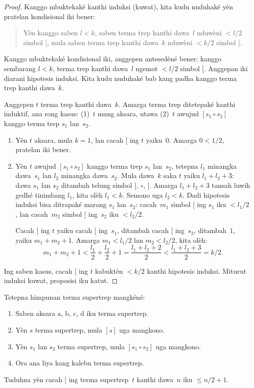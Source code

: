 \documentclass[../../../include/open-logic-section]{subfiles}
\begin{document}
\begin{proof}
Kanggo mbuktekaké kanthi induksi
(kuwat), kita kudu nuduhaké yèn
pratelan kondisional iki bener:
\begin{quote}
  Yèn kanggo saben $l < k$,
  saben terma trep kanthi dawa~$l$
  nduwèni $< l/2$ simbol $[$,
  mula saben terma trep kanthi
  dawa~$k$ nduwèni $< k/2$
  simbol $[$.
\end{quote}
Kanggo mbuktekaké kondisional
iki, anggepen antesedèné bener:
kanggo sembarang $l<k$,
terma trep kanthi dawa~$l$
ngemot $< l/2$ simbol $[$.
Anggepan iki diarani
hipotesis induksi. Kita kudu
nuduhaké bab kang padha kanggo
terma trep kanthi dawa~$k$.

Anggepen $t$ terma trep kanthi
dawa~$k$. Amarga terma trep
ditetepaké kanthi induktif,
ana rong kasus: (1)~$t$ mung
aksara, utawa (2)~$t$ awujud
$[s_1 \circ s_2]$ kanggo
terma trep $s_1$ lan~$s_2$.
\begin{enumerate}
\item Yèn $t$ aksara, mula
  $k = 1$, lan cacah $[$
  ing $t$ yaiku~$0$.
  Amarga $0 < 1/2$, pratelan
  iki bener.
\item Yèn $t$ awujud
  $[s_1 \circ s_2]$ kanggo
  terma trep $s_1$ lan~$s_2$,
  tetepna $l_1$ minangka
  dawa~$s_1$ lan $l_2$
  minangka dawa~$s_2$.
  Mula dawa~$k$ saka $t$
  yaiku $l_1+l_2+3$:
  dawa $s_1$ lan $s_2$
  ditambah telung simbol
  $[$, $\circ$, $]$.
  Amarga $l_1+l_2+3$
  tansah luwih gedhé tinimbang
  $l_1$, kita olèh $l_1 < k$.
  Semono uga $l_2
  < k$. Dadi hipotesis induksi
  bisa ditrapaké marang
  $s_1$ lan~$s_2$:
  cacah~$m_1$ simbol $[$
  ing $s_1$ iku $< l_1/2$,
  lan cacah~$m_2$ simbol $[$
  ing~$s_2$ iku $< l_2/2$.

  Cacah $[$ ing $t$
  yaiku cacah $[$ ing~$s_1$,
  ditambah cacah $[$ ing~$s_2$,
  ditambah~$1$, yaiku
  $m_1 + m_2 + 1$.
  Amarga $m_1
  < l_1/2$ lan $m_2 < l_2/2$,
  kita olèh:
  \[
  m_1 + m_2 + 1 < \frac{l_1}{2} + \frac{l_2}{2} + 1 = \frac{l_1+l_2+2}{2} < \frac{l_1+l_2+3}{2} = k/2.
  \]
\end{enumerate}
Ing saben kasus, cacah $[$
ing $t$ kabuktèn $< k/2$
kanthi hipotesis induksi.
Miturut induksi kuwat, proposisi
iku katut.
\end{proof}

\begin{prob}
  Tetepna himpunan terma
  supertrep mangkéné:
  \begin{enumerate}
  \item Saben aksara
    $\mathrm{a}$, $\mathrm{b}$,
    $\mathrm{c}$, $\mathrm{d}$
    iku terma supertrep.
  \item Yèn $s$ terma supertrep,
    mula $[s]$ uga mangkono.
  \item Yèn $s_1$ lan $s_2$
    terma supertrep, mula
    $[s_1 \circ s_2]$ uga mangkono.
  \item Ora ana liya kang
    kalebu terma supertrep.
  \end{enumerate}
  Tuduhna yèn cacah $[$
  ing terma supertrep~$t$
  kanthi dawa~$n$ iku
  $\le n/2 +1$.
\end{prob}
\end{document}
